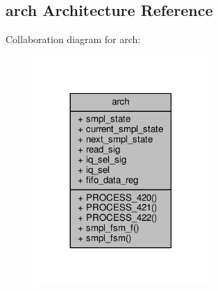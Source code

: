 \subsection{arch Architecture Reference}
\label{classrd__tx__fifo_1_1arch}


Collaboration diagram for arch\+:\nopagebreak
\begin{figure}[H]
\begin{center}
\leavevmode
\includegraphics[width=189pt]{d3/d37/classrd__tx__fifo_1_1arch__coll__graph}
\end{center}
\end{figure}
